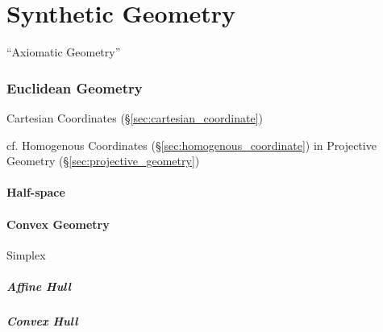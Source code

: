 \part{Synthetic Geometry}\label{part:synthetic_geometry}

``Axiomatic Geometry''



\section{Euclidean Geometry}\label{sec:euclidean_geometry}

Cartesian Coordinates (\S\ref{sec:cartesian_coordinate})

cf. Homogenous Coordinates (\S\ref{sec:homogenous_coordinate}) in
Projective Geometry (\S\ref{sec:projective_geometry})



\subsection{Half-space}\label{sec:half_space}

\subsection{Convex Geometry}\label{sec:convex_geometry}


Simplex



\subsubsection{Affine Hull}\label{sec:affine_hull}

\subsubsection{Convex Hull}\label{sec:convex_hull}




